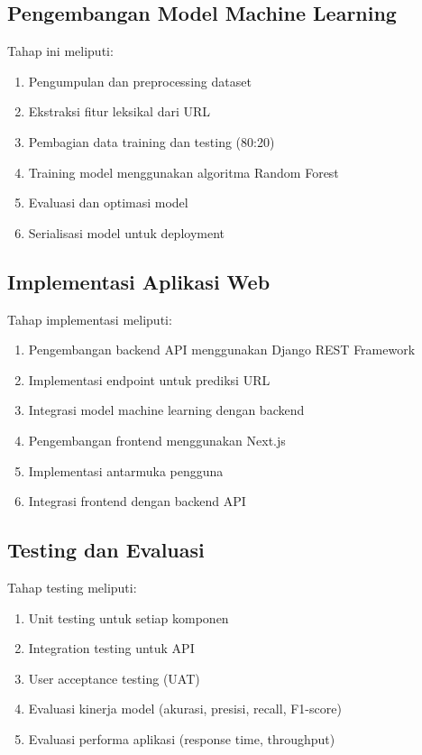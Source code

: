 \subsection{Pengembangan Model Machine Learning}

Tahap ini meliputi:
\begin{enumerate}
    \item Pengumpulan dan preprocessing dataset
    \item Ekstraksi fitur leksikal dari URL
    \item Pembagian data training dan testing (80:20)
    \item Training model menggunakan algoritma Random Forest
    \item Evaluasi dan optimasi model
    \item Serialisasi model untuk deployment
\end{enumerate}

\subsection{Implementasi Aplikasi Web}

Tahap implementasi meliputi:
\begin{enumerate}
    \item Pengembangan backend API menggunakan Django REST Framework
    \item Implementasi endpoint untuk prediksi URL
    \item Integrasi model machine learning dengan backend
    \item Pengembangan frontend menggunakan Next.js
    \item Implementasi antarmuka pengguna
    \item Integrasi frontend dengan backend API
\end{enumerate}

\subsection{Testing dan Evaluasi}

Tahap testing meliputi:
\begin{enumerate}
    \item Unit testing untuk setiap komponen
    \item Integration testing untuk API
    \item User acceptance testing (UAT)
    \item Evaluasi kinerja model (akurasi, presisi, recall, F1-score)
    \item Evaluasi performa aplikasi (response time, throughput)
\end{enumerate}

